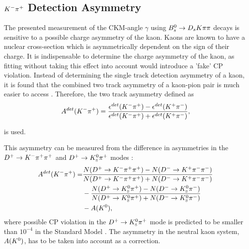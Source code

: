 

\clearpage
\subsection{${{K}^-}{{\pi}^+}$ Detection Asymmetry}
\label{sec:KpiAsym}

The presented measurement of the CKM-angle $\gamma$ using ${{B}^0_{s}}\rightarrow{\ensuremath{{D}_{s}}}{\ensuremath{K}}{\ensuremath{\pi}}{\ensuremath{\pi}}$ decays is sensitive to a possible charge asymmetry of the kaon. 
Kaons are known to have a nuclear cross-section which is asymmetrically dependent on the sign of their charge. 
It is indispensable to determine the charge asymmetry of the kaon, as fitting without taking this effect into account would introduce a 'fake' CP violation. 
Instead of determining the single track detection asymmetry of a kaon, it is found that the combined two track asymmetry of a kaon-pion pair is much easier to access \cite{Gordon:1482647} . 
Therefore, the two track asymmetry defined as 
\begin{equation}
A^{det}(\Km\pip) = \frac{\epsilon^{det}(\Km\pip) -\epsilon^{det}(\Kp\pim)}{\epsilon^{det}(\Km\pip) + \epsilon^{det}(\Kp\pim)},
\label{eq:KpiDetAsymDef}
\end{equation}

is used.

This asymmetry can be measured from the difference in asymmetries in the ${{D}^+}\rightarrow{\ensuremath{{K}^-}}{\ensuremath{{\pi}^+}}{\ensuremath{{\pi}^+}}$ and ${{D}^+}\rightarrow{\ensuremath{{K}^0_{\mathrm{ \scriptscriptstyle S}}}}{\ensuremath{{\pi}^+}}$ modes
\cite{Davis:2310213}:
\begin{equation}
\begin{split}
A^{det}(\Km\pip) = & \frac{N(\Dp\to\Km\pip\pip) - N(\Dm\to\Kp\pim\pim)}{N(\Dp\to\Km\pip\pip) + N(\Dm\to\Kp\pim\pim)} \\
                  & - \frac{N(\Dp\to\KS\pip) - N(\Dm\to\KS\pim)}{N(\Dp\to\KS\pip) + N(\Dm\to\KS\pim)} \\
                  & - A(\Kz),
\end{split}
\label{eq:KpiDetAsymDef}
\end{equation}
where possible CP violation in the ${{D}^+}\rightarrow{\ensuremath{{K}^0_{\mathrm{ \scriptscriptstyle S}}}}{\ensuremath{{\pi}^+}}$ mode is predicted to be smaller than $10^{-4}$ in the Standard Model \cite{Bigi:1994aw}.
The asymmetry in the neutral kaon system, $A({{K}^0})$, has to be taken into account as a correction. 

